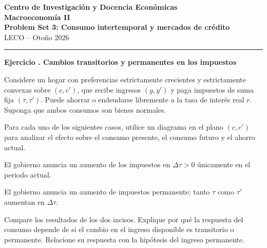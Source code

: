\documentclass[11pt]{article}
\let\enumerateoriginal\enumerate
\let\endenumerateoriginal\endenumerate
\renewenvironment{enumerate}{%
  \enumerateoriginal
  \setlength{\itemsep}{0.5em}%
  \setlength{\parsep}{0pt}%
  \setlength{\topsep}{0.4em}%
}{\endenumerateoriginal}
\newcounter{problema}
\newenvironment{problema}[1]{%
  \par
  \refstepcounter{problema}%
  \addvspace{0.9em}%
  \noindent\textbf{Ejercicio \theproblema. #1}
  \par\nobreak\smallskip
}{\par}
\begin{document}
\begin{center}
  {\large\textbf{Centro de Investigación y Docencia Económicas}}\\[0.25em]
  {\large\textbf{Macroeconomía II}}\\[0.2em]
  {\large\textbf{Problem Set 3: Consumo intertemporal y mercados de crédito}}\\[0.35em]
  LECO -- Otoño 2026
\end{center}

\vspace{0.6em}
\hrule
\vspace{0.6em}



\begin{problema}{Cambios transitorios y permanentes en los impuestos}
Considere un hogar con preferencias estrictamente crecientes y estrictamente convexas sobre $(c,c')$, que recibe ingresos $(y,y')$ y paga impuestos de suma fija $(\tau,\tau')$. Puede ahorrar o endeudarse libremente a la tasa de interés real $r$. Suponga que ambos consumos son bienes normales.

Para cada uno de los siguientes casos, utilice un diagrama en el plano $(c,c')$ para analizar el efecto sobre el consumo presente, el consumo futuro y el ahorro actual.

\begin{enumerate}
  \item El gobierno anuncia un aumento de los impuestos en $\Delta\tau>0$ únicamente en el periodo actual.

  \item El gobierno anuncia un aumento de impuestos permanente: tanto $\tau$ como $\tau'$ aumentan en $\Delta\tau$.

  \item Compare los resultados de los dos incisos. Explique por qué la respuesta del consumo depende de si el cambio en el ingreso disponible es transitorio o permanente. Relacione su respuesta con la hipótesis del ingreso permanente.
\end{enumerate}
\end{problema}
\end{document}
